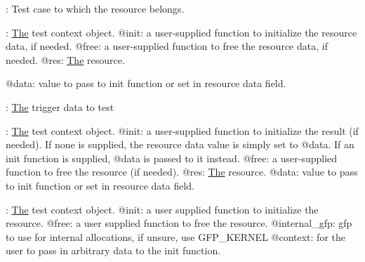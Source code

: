 
\begin{DoxyRefList}
\item[Module \mbox{\hyperlink{test_8h_amgrp74096df8ae3faa9e2bf0c6554cb95028}{\+: match name.}} ]\label{test__test000012}%
%
\+: Test case to which the resource belongs.


\item[Module \mbox{\hyperlink{test_8h_amgrp9e120ab3b17ca50c20af4d9ae58d0f29}{\+: name to be set for resource.}} ]\label{test__test000007}%
%
\+: \mbox{\hyperlink{classThe}{The}} test context object. @init\+: a user-\/supplied function to initialize the resource data, if needed. @free\+: a user-\/supplied function to free the resource data, if needed. @res\+: \mbox{\hyperlink{classThe}{The}} resource.

@data\+: value to pass to init function or set in resource data field.  
\item[Member \mbox{\hyperlink{trace__events__trigger_8c_a73c6b9d214120d4f0876a77f8ff3bea9}{is\+\_\+named\+\_\+trigger}} (struct \mbox{\hyperlink{structevent__trigger__data}{event\+\_\+trigger\+\_\+data}} $\ast$test)]\label{test__test000002}%
%
\+: \mbox{\hyperlink{classThe}{The}} trigger data to test 
\item[Member \mbox{\hyperlink{kunit_2test_8c_a87b2a023667cc4809fec430f6c00df66}{kunit\+\_\+add\+\_\+resource}} (struct kunit $\ast$test, kunit\+\_\+resource\+\_\+init\+\_\+t init, kunit\+\_\+resource\+\_\+free\+\_\+t free, struct \mbox{\hyperlink{structkunit__resource}{kunit\+\_\+resource}} $\ast$res, void $\ast$data)]\label{test__test000006}%
%
\+: \mbox{\hyperlink{classThe}{The}} test context object. @init\+: a user-\/supplied function to initialize the result (if needed). If none is supplied, the resource data value is simply set to @data. If an init function is supplied, @data is passed to it instead. @free\+: a user-\/supplied function to free the resource (if needed). @res\+: \mbox{\hyperlink{classThe}{The}} resource. @data\+: value to pass to init function or set in resource data field.  
\item[Member \mbox{\hyperlink{test_8h_a8a21e93180a4d3d280554192bf2271ca}{kunit\+\_\+alloc\+\_\+resource}} (struct kunit $\ast$test, kunit\+\_\+resource\+\_\+init\+\_\+t init, kunit\+\_\+resource\+\_\+free\+\_\+t free, gfp\+\_\+t internal\+\_\+gfp, void $\ast$context)]\label{test__test000008}%
%
\+: \mbox{\hyperlink{classThe}{The}} test context object. @init\+: a user supplied function to initialize the resource. @free\+: a user supplied function to free the resource. @internal\+\_\+gfp\+: gfp to use for internal allocations, if unsure, use G\+F\+P\+\_\+\+K\+E\+R\+N\+EL @context\+: for the user to pass in arbitrary data to the init function. 

\end{DoxyRefList}
